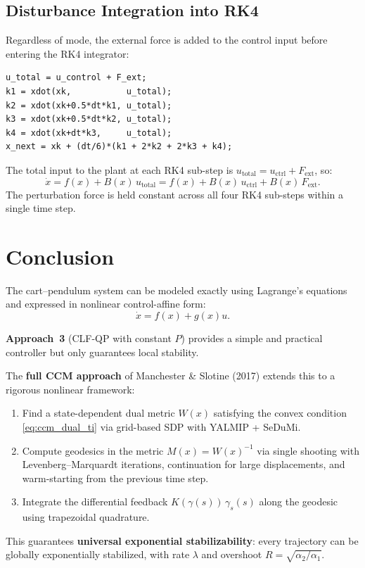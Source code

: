 \documentclass[11pt,a4paper]{article}
\begin{document}
\subsection{Disturbance Integration into RK4}

Regardless of mode, the external force is added to the control input before entering the RK4 integrator:

\begin{lstlisting}
u_total = u_control + F_ext;
k1 = xdot(xk,           u_total);
k2 = xdot(xk+0.5*dt*k1, u_total);
k3 = xdot(xk+0.5*dt*k2, u_total);
k4 = xdot(xk+dt*k3,     u_total);
x_next = xk + (dt/6)*(k1 + 2*k2 + 2*k3 + k4);
\end{lstlisting}

\begin{codemath}
The total input to the plant at each RK4 sub-step is \(u_{\mathrm{total}} = u_{\mathrm{ctrl}} + F_{\mathrm{ext}}\), so:
\[
\dot x = f(x) + B(x)\,u_{\mathrm{total}} = f(x) + B(x)\,u_{\mathrm{ctrl}} + B(x)\,F_{\mathrm{ext}}.
\]
The perturbation force is held constant across all four RK4 sub-steps within a single time step.
\end{codemath}


\section{Conclusion}

The cart--pendulum system can be modeled exactly using Lagrange's equations and expressed in nonlinear control-affine form:
\[
\dot x = f(x)+g(x)u.
\]

\textbf{Approach~3} (CLF-QP with constant \(P\)) provides a simple and practical controller but only guarantees local stability.

The \textbf{full CCM approach} of Manchester \& Slotine (2017) extends this to a rigorous nonlinear framework:
\begin{enumerate}[leftmargin=2em]
    \item Find a state-dependent dual metric \(W(x)\) satisfying the convex condition \eqref{eq:ccm_dual_ti} via grid-based SDP with YALMIP + SeDuMi.
    \item Compute geodesics in the metric \(M(x) = W(x)^{-1}\) via single shooting with Levenberg--Marquardt iterations, continuation for large displacements, and warm-starting from the previous time step.
    \item Integrate the differential feedback \(K(\gamma(s))\,\gamma_s(s)\) along the geodesic using trapezoidal quadrature.
\end{enumerate}
This guarantees \textbf{universal exponential stabilizability}: every trajectory can be globally exponentially stabilized, with rate \(\lambda\) and overshoot \(R = \sqrt{\alpha_2/\alpha_1}\).
\end{document}
